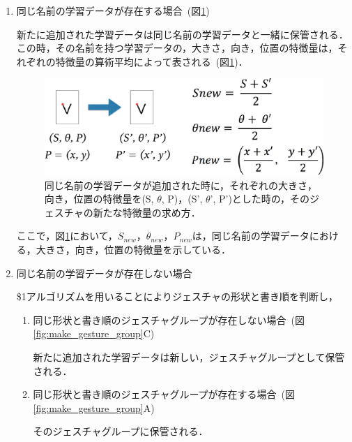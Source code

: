\begin{enumerate}
\renewcommand{\labelenumi}{\Alph{enumi}.}
\item 同じ名前の学習データが存在する場合~(図\ref{fig:same_gesture})

新たに追加された学習データは同じ名前の学習データと一緒に保管される．この時，その名前を持つ学習データの，大きさ，向き，位置の特徴量は，それぞれの特徴量の算術平均によって表される~(図\ref{fig:same_gesture})．

\begin{figure} [h!]
	\begin{center}
		\includegraphics [width=0.9\hsize ]{img/same_gesture.eps}
	\end{center}
	\caption{同じ名前の学習データが追加された時に，それぞれの大きさ，向き，位置の特徴量を(S, $\theta$, P)，(S', $\theta$', P')とした時の，そのジェスチャの新たな特徴量の求め方．}
	\label{fig:same_gesture}
\end{figure}

ここで，図\ref{fig:same_gesture}において，$S_\textit{new}$，$\theta_\textit{new}$，$P_\textit{new}$は，同じ名前の学習データにおける，大きさ，向き，位置の特徴量を示している．

 
\item 同じ名前の学習データが存在しない場合

\$1アルゴリズムを用いることによりジェスチャの形状と書き順を判断し，

\begin{enumerate}
\renewcommand{\labelenumi}{\alph{enumi}.}

\item 同じ形状と書き順のジェスチャグループが存在しない場合~(図\ref{fig:make_gesture_group}C)
 
新たに追加された学習データは新しい，ジェスチャグループとして保管される．
   
\item 同じ形状と書き順のジェスチャグループが存在する場合~(図\ref{fig:make_gesture_group}A)

そのジェスチャグループに保管される．

\end{enumerate}
\end{enumerate}

